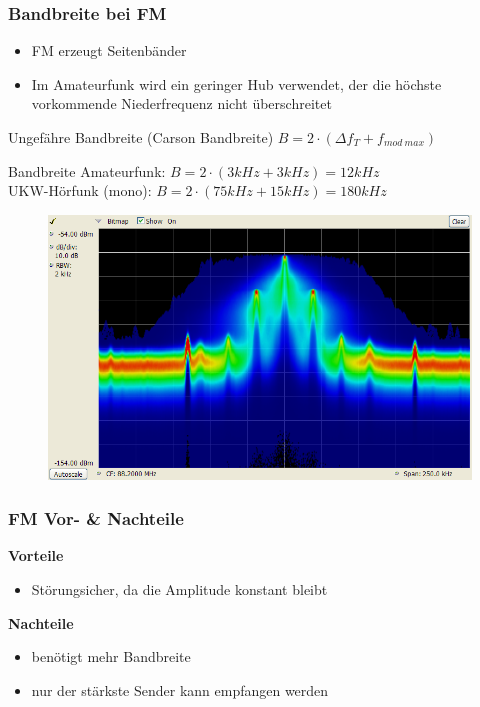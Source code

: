 \begin{frame}
\frametitle{Bandbreite bei FM}
\begin{itemize}
	\item FM erzeugt Seitenbänder
	\item Im Amateurfunk wird ein geringer Hub verwendet, der die höchste vorkommende Niederfrequenz nicht überschreitet
\end{itemize}
\begin{block}{Ungefähre Bandbreite (Carson Bandbreite)}
  $B = 2 \cdot (\Delta f_T + f_{mod~max})$
\end{block}
\begin{exampleblock}{Bandbreite}
  Amateurfunk: $B =2 \cdot (3kHz + 3kHz) = 12kHz$\\
  UKW-Hörfunk (mono): $B = 2 \cdot (75kHz + 15kHz) = 180kHz$
\end{exampleblock}
\end{frame}

\begin{frame}
  \begin{center}
     \begin{figure}
      \includegraphics[width=1\textwidth,height=.85\textheight,keepaspectratio]{e14/Dpx-fm-radio.png}
    \end{figure}
  \end{center}
\end{frame}


\begin{frame}
\frametitle{FM Vor- \& Nachteile}
\textbf{\Large{Vorteile}}
\begin{itemize}
	\item Störungsicher, da die Amplitude konstant bleibt 
\end{itemize}
\vspace{1cm}
\textbf{\Large{Nachteile}}
\begin{itemize}
	\item benötigt mehr Bandbreite
	\item nur der stärkste Sender kann empfangen werden
\end{itemize}
\end{frame}

